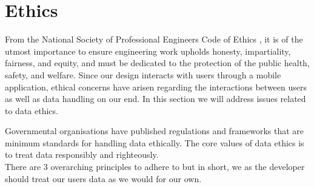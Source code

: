\section{Ethics}
From the National Society of Professional Engineers Code of Ethics , it is of the utmost 
importance to ensure engineering work upholds honesty, impartiality, fairness, and equity, and must be dedicated to 
the protection of the public health, safety, and welfare. Since our design interacts with users
through a mobile application, ethical concerns have arisen regarding the interactions between users 
as well as data handling on our end. In this section we will address issues related to data ethics.

Governmental organisations have published regulations  and frameworks
 that are minimum standards for handling data ethically. The core values of data ethics 
is to treat data responsibly and righteously.
\\
There are 3 overarching principles to adhere to but in short, we as the developer should treat our 
users\textsc{} data as we would for our own.

